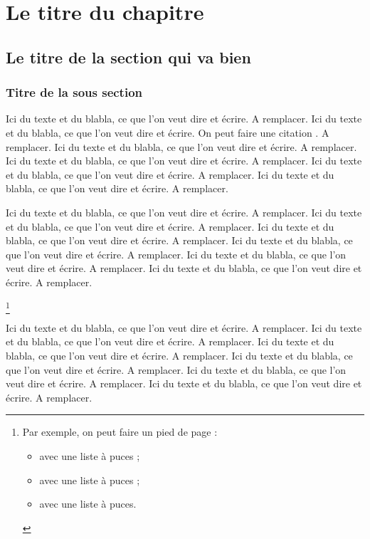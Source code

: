 \chapter{Le titre du chapitre}

\section{Le titre de la section qui va bien}

\subsection{Titre de la sous section}

Ici du texte et du blabla, ce que l'on veut dire et écrire. A remplacer. Ici du texte et du blabla, ce que l'on veut dire et écrire. On peut faire une citation \cite{MotClef4}.
A remplacer. Ici du texte et du blabla, ce que l'on veut dire et écrire. A remplacer. Ici du texte et du blabla, ce que l'on veut dire et écrire. A remplacer. Ici du texte et du blabla, ce que l'on veut dire et écrire. A remplacer. Ici du texte et du blabla, ce que l'on veut dire et écrire. A remplacer.

Ici du texte et du blabla, ce que l'on veut dire et écrire. A remplacer. Ici du texte et du blabla, ce que l'on veut dire et écrire. A remplacer.
Ici du texte et du blabla, ce que l'on veut dire et écrire. A remplacer. Ici du texte et du blabla, ce que l'on veut dire et écrire. A remplacer. Ici du texte et du blabla, ce que l'on veut dire et écrire. A remplacer. Ici du texte et du blabla, ce que l'on veut dire et écrire. A remplacer.

\protect\footnote{Par exemple, on peut faire un pied de page :
\begin{itemize}
\item avec une liste à puces ;
\item avec une liste à puces ;
\item avec une liste à puces.
\end{itemize}
}

Ici du texte et du blabla, ce que l'on veut dire et écrire. A remplacer. Ici du texte et du blabla, ce que l'on veut dire et écrire. A remplacer. Ici du texte et du blabla, ce que l'on veut dire et écrire. A remplacer. Ici du texte et du blabla, ce que l'on veut dire et écrire. A remplacer. Ici du texte et du blabla, ce que l'on veut dire et écrire. A remplacer. Ici du texte et du blabla, ce que l'on veut dire et écrire. A remplacer.

